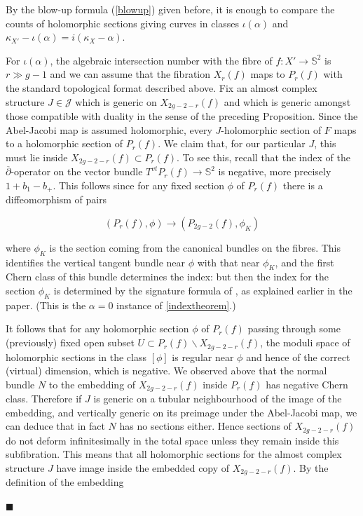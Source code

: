 \documentclass[10pt]{article}
\newcommand{\sss}{\mathbb{S}}
\newcommand{\cdbar}{\overline{\partial}}
\newenvironment{Pf}{\par \noindent{\sc Proof:} }{\quad $\blacksquare$ \par
\vspace{0.5cm}}
\begin{document}
\begin{Pf}
By the blow-up formula (\ref{blowup}) given before, 
it is enough to compare the counts of holomorphic sections giving curves
in classes $\iota(\alpha)$ and $\kappa_{X'} - \iota(\alpha) = i(\kappa_X
- \alpha)$.   

\vspace{0.2cm}

\noindent For $\iota(\alpha)$, the algebraic intersection number with the
fibre of $f: X' \rightarrow \sss^2$ is $r \gg g-1$ and we can assume
that the fibration $X_r(f)$ maps to $P_r(f)$ with the standard
topological format
described above.  Fix an almost complex structure $J \in \mathcal{J}$ which
is generic on $X_{2g-2-r}(f)$ and which is generic amongst those
compatible with duality in
the sense of the preceding Proposition.  Since the Abel-Jacobi map is
assumed holomorphic, every ${J}$-holomorphic section of $F$
maps to a holomorphic section of $P_r(f)$.  We claim that, for
our particular ${J}$, this must
lie inside $X_{2g-2-r}(f) \subset P_r(f)$.  To see this, recall that the
index of the $\cdbar$-operator on the vector bundle $T^{vt}P_r(f)
\rightarrow \sss^2$ is negative, more precisely $1+b_1-b_+$.  This
follows since for any fixed section $\phi$ of
$P_r(f)$ there is a diffeomorphism of pairs 

$$(P_r(f), \phi) \rightarrow (P_{2g-2}(f), \phi_K)$$

\noindent where $\phi_K$ is the section coming from the canonical
bundles on the fibres.  This identifies the vertical tangent bundle
near $\phi$ with that near $\phi_K$, and the first Chern class of this
bundle determines the index:  but then the index for the section
$\phi_K$ is determined by the signature formula of \cite{ivanhodge},
as explained earlier in the paper.  (This is the $\alpha = 0$ instance
of \ref{indextheorem}.)

\vspace{0.2cm}

\noindent It follows that for any holomorphic section $\phi$ of
$P_r(f)$ passing through some (previously) fixed open subset $U
\subset P_r(f) \backslash X_{2g-2-r}(f)$, the moduli space of
holomorphic sections in the class
$[\phi]$ is regular near $\phi$ and hence of the correct (virtual)
dimension, which is negative.  We observed above that the normal bundle $N$
to the embedding of
$X_{2g-2-r}(f)$ inside $P_r(f)$ has negative Chern class.  Therefore if $J$ is
generic on a
tubular neighbourhood of the image of the embedding, and vertically
generic on its preimage under the Abel-Jacobi map, 
we can deduce that in fact $N$ has no
sections either.  Hence sections of $X_{2g-2-r}(f)$ do not deform
infinitesimally in the total space unless they remain inside this
subfibration.  This means that all holomorphic sections for the
almost complex structure ${J}$ have image inside the embedded copy of
$X_{2g-2-r}(f)$.   By the
definition of the embedding 


\end{Pf}
\end{document}
